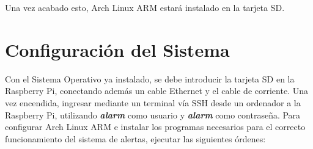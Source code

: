     Una vez acabado esto, Arch Linux ARM estará instalado en la tarjeta SD.

    \section{Configuración del Sistema}

    Con el Sistema Operativo ya instalado, se debe introducir la tarjeta SD en la Raspberry Pi, conectando además un cable Ethernet y el cable de corriente. Una vez encendida, ingresar mediante un terminal vía SSH desde un ordenador a la Raspberry Pi, utilizando \textbf{\textit{alarm}} como usuario y \textbf{\textit{alarm}} como contraseña. Para configurar Arch Linux ARM e instalar los programas necesarios para el correcto funcionamiento del sistema de alertas, ejecutar las siguientes órdenes:

